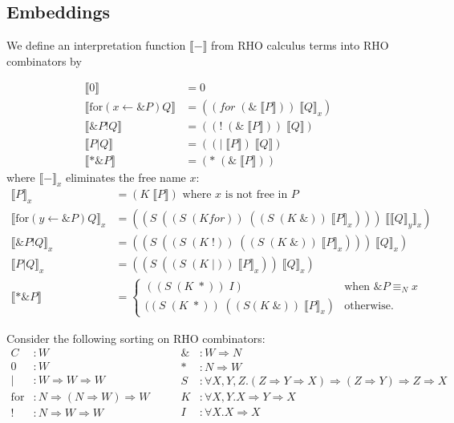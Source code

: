 \documentclass[a4paper,UKenglish]{lipics-v2016}
\newcommand{\for}{\mathrm{for }}
\newcommand{\interp}[1]{\llbracket #1 \rrbracket}
\newcommand{\from}{\leftarrow}
\begin{document}
\subsection{Embeddings}
We define an interpretation function $\interp{-}$ from RHO calculus terms into RHO combinators by

\[\begin{array}{rl}
  \interp{0} &= 0 \\
  \interp{\for(x \from \&P)Q} &= ((for\; (\&\; \interp{P}))\; \interp{Q}_x)\\
  \interp{\&P!Q} &= ((!\; (\&\; \interp{P}))\; \interp{Q}) \\
  \interp{P|Q} &= ((|\; \interp{P})\; \interp{Q})\\
  \interp{*\&P} &= (*\; (\&\; \interp{P}))
\end{array}\]
where $\interp{-}_x$ eliminates the free name $x:$
\[\begin{array}{rl}
  \interp{P}_x &= (K\; \interp{P}) \mbox{ where $x$ is not free in } P \\
  \interp{\for(y \from \&P)Q}_x &= ((S\; ((S\; (K for))\; ((S\; (K\; \&))\; \interp{P}_x)))\; \interp{\interp{Q}_y}_x) \\
  \interp{\&P!Q}_x &= ((S\; ((S\; (K\; !))\; ((S\; (K\; \&))\; \interp{P}_x)))\; \interp{Q}_x) \\
  \interp{P|Q}_x &= ((S\; ((S\; (K\; |))\; \interp{P}_x))\; \interp{Q}_x) \\
  \interp{*\&P} &= \left\{\begin{array}{ll}
    ((S\; (K\; *))\; I) & \mbox{when } \&P \equiv_N x\\
    ((S\; (K\; *))\; ((S (K\; \&))\; \interp{P}_x) & \mbox{otherwise.}
  \end{array}\right.
\end{array}\]

Consider the following sorting on RHO combinators:
\[\begin{array}{rl}
  C &: W\\
  0 &: W\\
  | &: W \Rightarrow W \Rightarrow W\\
  \for &: N \Rightarrow (N \Rightarrow W) \Rightarrow W\\
  ! &: N \Rightarrow W \Rightarrow W\\
\end{array}\quad\quad
\begin{array}{rl}
  \& &: W \Rightarrow N\\
  * &: N \Rightarrow W\\
  S &: \forall X,Y,Z.(Z \Rightarrow Y \Rightarrow X) \Rightarrow (Z \Rightarrow Y) \Rightarrow Z \Rightarrow X\\
  K &: \forall X,Y.X \Rightarrow Y \Rightarrow X\\
  I &: \forall X.X \Rightarrow X\\
\end{array}\]
\end{document}
